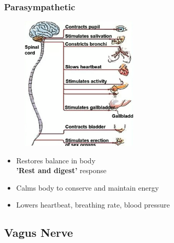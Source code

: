 \documentclass[a4paper,12pt]{article}
\begin{document}
\subsubsection{Parasympathetic}
\begin{figure}[H]
    \centering
    \includegraphics[width=0.50\textwidth]{parasympathetic}
\end{figure}
\begin{itemize}
    \item{Restores balance in body \\ \textbf{'Rest and digest'} response}
    \item{Calms body to conserve and maintain energy}
    \item{Lowers heartbeat, breathing rate, blood pressure}
\end{itemize}

\subsection{Vagus Nerve}
\end{document}
